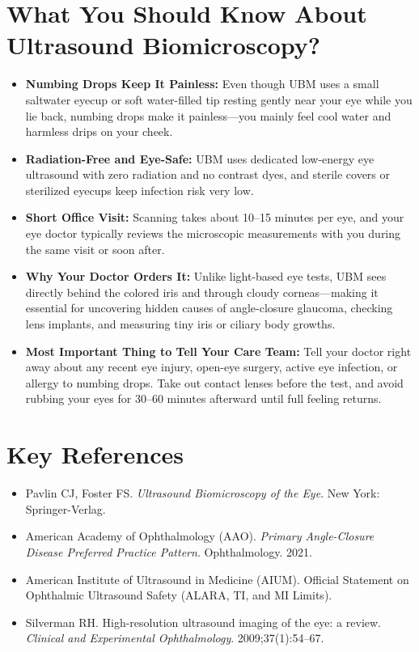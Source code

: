 \section{What You Should Know About Ultrasound Biomicroscopy?}

\begin{itemize}
    \item \textbf{Numbing Drops Keep It Painless:} Even though UBM uses a small saltwater eyecup or soft water-filled tip resting gently near your eye while you lie back, numbing drops make it painless---you mainly feel cool water and harmless drips on your cheek.
    \item \textbf{Radiation-Free and Eye-Safe:} UBM uses dedicated low-energy eye ultrasound with zero radiation and no contrast dyes, and sterile covers or sterilized eyecups keep infection risk very low.
    \item \textbf{Short Office Visit:} Scanning takes about 10--15 minutes per eye, and your eye doctor typically reviews the microscopic measurements with you during the same visit or soon after.
    \item \textbf{Why Your Doctor Orders It:} Unlike light-based eye tests, UBM sees directly behind the colored iris and through cloudy corneas---making it essential for uncovering hidden causes of angle-closure glaucoma, checking lens implants, and measuring tiny iris or ciliary body growths.
    \item \textbf{Most Important Thing to Tell Your Care Team:} Tell your doctor right away about any recent eye injury, open-eye surgery, active eye infection, or allergy to numbing drops. Take out contact lenses before the test, and avoid rubbing your eyes for 30--60 minutes afterward until full feeling returns.
\end{itemize}

\section{Key References}

\begin{itemize}
    \item Pavlin CJ, Foster FS. \textit{Ultrasound Biomicroscopy of the Eye}. New York: Springer-Verlag.
    \item American Academy of Ophthalmology (AAO). \textit{Primary Angle-Closure Disease Preferred Practice Pattern}. Ophthalmology. 2021.
    \item American Institute of Ultrasound in Medicine (AIUM). Official Statement on Ophthalmic Ultrasound Safety (ALARA, TI, and MI Limits).
    \item Silverman RH. High-resolution ultrasound imaging of the eye: a review. \textit{Clinical and Experimental Ophthalmology}. 2009;37(1):54--67.
\end{itemize}
